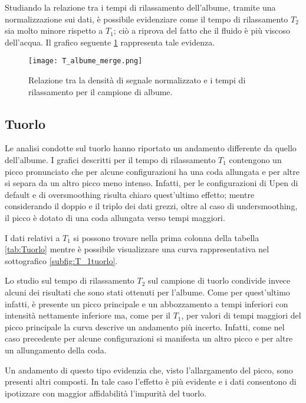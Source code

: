 Studiando la relazione tra i tempi di rilassamento dell'albume, tramite una normalizzazione sui dati, è possibile evidenziare come il tempo di rilassamento $T_2$ sia molto minore rispetto a $T_1$;
ciò a riprova del fatto che il fluido è più viscoso dell'acqua.   
Il grafico seguente \ref{fig:Albume} rappresenta tale evidenza.

\begin{figure}[h]
\centering
\texttt{[image: T\_albume\_merge.png]}
\caption{Relazione tra la densità di segnale normalizzato e i tempi di rilassamento per il campione di albume.}
\label{fig:Albume}
\end{figure}




\subsection*{Tuorlo}

Le analisi condotte sul tuorlo hanno riportato un andamento differente da quello dell'albume.
I grafici descritti per il tempo di rilassamento $T_1$ contengono un picco pronunciato che per alcune configurazioni ha una coda allungata e per altre si separa da un altro picco meno intenso.
Infatti, per le configurazioni di Upen di default e di oversmoothing risulta chiaro quest'ultimo effetto; mentre considerando il doppio e il triplo dei dati grezzi, oltre al caso di undersmoothing, il picco è dotato di una coda allungata verso tempi maggiori.

I dati relativi a $T_1$ si possono trovare nella prima colonna della tabella \ref{tab:Tuorlo} mentre è possibile visualizzare una curva rappresentativa nel sottografico \ref{subfig:T_1tuorlo}. 

Lo studio sul tempo di rilassamento $T_2$ sul campione di tuorlo condivide invece alcuni dei risultati che sono stati ottenuti per l'albume. 
Come per quest'ultimo infatti, è presente un picco principale e un abbozzamento a tempi inferiori con intensità nettamente inferiore ma, come per il $T_1$, per valori di tempi maggiori del picco principale la curva descrive un andamento più incerto.
Infatti, come nel caso precedente per alcune configurazioni si manifesta un altro picco e per altre un allungamento della coda.

Un andamento di questo tipo evidenzia che, visto l'allargamento del picco, sono presenti altri composti.
In tale caso l'effetto è più evidente e i dati consentono di ipotizzare con maggior affidabilità l'impurità del tuorlo.

